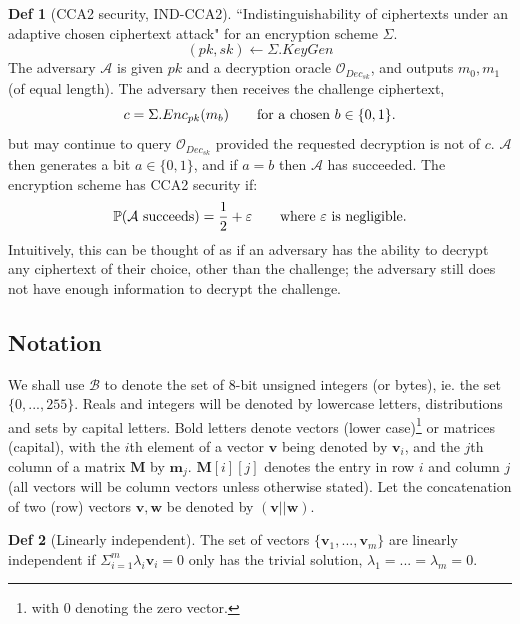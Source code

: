 \documentclass[a4paper, 10pt]{article}
\theoremstyle{definition}
\newtheorem{definition}{Def}[section]
\begin{document}
\begin{definition}[\ac{CCA2} security, \ac{IND}-\ac{CCA2}]
    ``Indistinguishability of ciphertexts under an adaptive chosen ciphertext attack" for an encryption scheme $\Sigma $.\\
    \[(pk, sk) \leftarrow \Sigma.KeyGen \]
    The adversary $\mathcal{A} $ is given $pk$ and a decryption oracle $\mathcal{O}_{Dec_{sk}}$, and outputs $m_0, m_1$ (of equal length). The adversary then receives the challenge ciphertext,
    \[c=\Sigma .Enc_{pk}(m_b)\text{\qquad for a chosen }b \in \{ 0,1\}.\]
    but may continue to query $\mathcal{O}_{Dec_{sk}}$ provided the requested decryption is not of $c$.
    $\mathcal{A} $ then generates a bit $a \in \{ 0, 1\}$, and if $a=b$ then $\mathcal{A} $ has succeeded.
    The encryption scheme has \ac{CCA2} security if:
    \[\mathbb{P} (\mathcal{A} \text{ succeeds}) = \frac{1}{2} + \varepsilon \text{\qquad where $\varepsilon$ is negligible.}\]
    Intuitively, this can be thought of as if an adversary has the ability to decrypt any ciphertext of their choice, other than the challenge; the adversary still does not have enough information to decrypt the challenge.
\end{definition}

\subsection{Notation}


We shall use $\mathcal{B} $ to denote the set of 8-bit unsigned integers (or bytes), ie. the set $\{0, ..., 255\}$. Reals and integers will be denoted by lowercase letters, distributions and sets by capital letters. Bold letters denote vectors (lower case)\footnote{with $0$ denoting the zero vector.} or matrices (capital), with the $i$th element of a vector $\mathbf{v}$ being denoted by $\mathbf{v}_i$, and the $j$th column of a matrix $\mathbf{M}$ by $\mathbf{m}_j$. $\mathbf{M}[i][j]$ denotes the entry in row $i$ and column $j$ (all vectors will be column vectors unless otherwise stated). Let the concatenation of two (row) vectors $\mathbf{v, w}$ be denoted by $(\mathbf{v} || \mathbf{w})$.

\begin{definition}[Linearly independent]
    The set of vectors $\{\textbf{v}_1,...,\textbf{v}_m\}$ are linearly independent if $\Sigma_{i=1}^m \lambda _i \mathbf{v}_i = 0$ only has the trivial solution, $\lambda _1 = ... = \lambda _m = 0$.
\end{definition}
\end{document}

